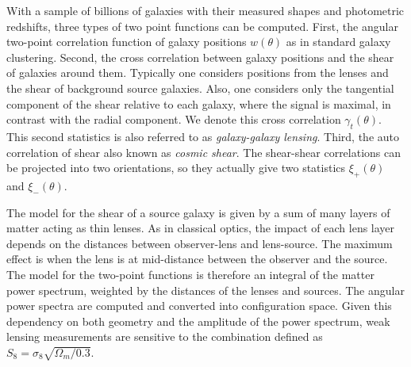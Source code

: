     With a sample of billions of galaxies with their measured shapes and photometric redshifts, 
    three types of two point functions can be computed. 
    First, the angular two-point correlation function of galaxy positions $w(\theta)$ as in standard galaxy clustering. 
    Second, the cross correlation between galaxy positions and the shear of galaxies around them.
    Typically one considers positions from the lenses and the shear of background source galaxies.
    Also, one considers only the tangential component of the shear relative to each galaxy, where the signal 
    is maximal, in contrast with the radial component. We denote this cross correlation $\gamma_t(\theta)$. 
    This second statistics is also referred to as \emph{galaxy-galaxy lensing}. 
    Third, the auto correlation of shear also known as \emph{cosmic shear}. 
    The shear-shear correlations can be projected into two orientations, 
    so they actually give two statistics $\xi_{+}(\theta)$ and $\xi_{-}(\theta)$. 
    
    The model for the shear of a source galaxy is given by a sum of many layers of matter acting as thin lenses. 
    As in classical optics, the impact of each lens layer depends on the distances between observer-lens and lens-source. 
    The maximum effect is when the lens is at mid-distance between the observer and the source. 
    The model for the two-point functions is therefore an integral of the matter power spectrum, weighted by the distances
    of the lenses and sources. 
    The angular power spectra are computed and converted into configuration space.
    Given this dependency on both geometry and the amplitude of the power spectrum, 
    weak lensing measurements are sensitive to the combination defined as  
    $S_8 = \sigma_8 \sqrt{\Omega_m/0.3}$.

